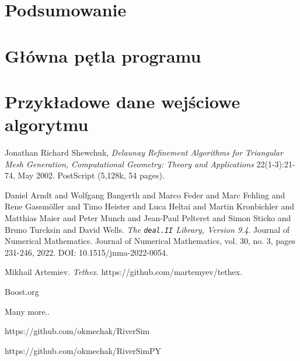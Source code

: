 \documentclass[]{pracamgr}
\begin{document}
\chapter{Podsumowanie}

\appendix

\chapter{Główna pętla programu}

\chapter{Przykładowe dane wejściowe algorytmu}

\begin{thebibliography}{99}

 Jonathan Richard Shewchuk, \textit{Delaunay Refinement Algorithms for Triangular Mesh Generation, Computational Geometry: Theory and Applications} 22(1-3):21-74, May 2002. PostScript (5,128k, 54 pages).

 Daniel Arndt and Wolfgang Bangerth and Marco Feder and
Marc Fehling and Rene Gassm{\"o}ller and Timo Heister
and Luca Heltai and Martin Kronbichler and
Matthias Maier and Peter Munch and Jean-Paul Pelteret
and Simon Sticko and Bruno Turcksin and David Wells. \textit{The \texttt{deal.II} Library, Version 9.4}.
Journal of Numerical Mathematics. Journal of Numerical Mathematics, vol. 30, no. 3, pages 231-246, 2022.
DOI: 10.1515/jnma-2022-0054.

 Mikhail Artemiev. \textit{Tethex}. https://github.com/martemyev/tethex.

 Boost.org

 Many more.. 

 https://github.com/okmechak/RiverSim

 https://github.com/okmechak/RiverSimPY

\end{thebibliography}
\end{document}
